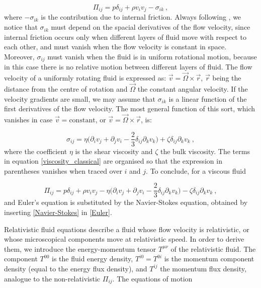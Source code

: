 \begin{equation}
\Pi_{ij} = p \delta_{ij} + \rho v_i v_j - \sigma_{ik} \: ,
\end{equation}
%
where $-\sigma_{ik}$ is the contribution due to internal friction. Always following \cite{landau2013fluid}, we notice that $\sigma_{ik}$ must depend on the spacial derivatives of the flow velocity, since internal friction occurs only when different layers of fluid move with respect to each other, and must vanish when the flow velocity is constant in space. Moreover, $\sigma_{ij}$
must vanish when the fluid is in uniform rotational motion, because in this case there is no relative motion between different layers of fluid. The flow velocity of a uniformly rotating fluid is expressed as: $\vec v = \vec \Omega \times \vec r$, $\vec r$ being the distance from the centre of rotation and $\vec \Omega$ the constant angular velocity. If the velocity gradients are small, we may assume that $\sigma_{ik}$ is a linear function of the first derivatives of the flow velocity. The most general function of this sort, which vanishes in case $\vec v = \mathrm{constant}$, or $\vec v = \vec \Omega \times \vec r$, is:

\begin{equation}
\sigma_{ij} = \eta \biggl( \partial_i v_j + \partial_j v_i -\frac{2}{3} \delta_{ij} \partial_k v_k \biggr) + \zeta \delta_{ij} \partial_{k} v_k \: ,
\label{viscosity_classical}
\end{equation}
%
where the coefficient $\eta$ is the shear viscosity and $\zeta$ the bulk viscosity. The terms in equation \ref{viscosity_classical} are organised so that the expression in parentheses vanishes when traced over $i$ and $j$. To conclude, for a viscous fluid

\begin{equation}
\Pi_{ij} = p \delta_{ij} + \rho v_i v_j - \eta \biggl( \partial_i v_j + \partial_j v_i -\frac{2}{3} \delta_{ij} \partial_k v_k \biggr) - \zeta \delta_{ij} \partial_{k} v_k \: ,
\label{Navier-Stokes}
\end{equation}
%
and Euler's equation is substituted by the Navier-Stokes equation, obtained by inserting \ref{Navier-Stokes} in \ref{Euler}.


Relativistic fluid equations describe a fluid whose flow velocity is relativistic, or whose microscopical components move at relativistic speed. In order to derive them, we introduce the energy-momentum tensor $T^{\mu\nu}$ of the relativistic fluid. The component $T^{00}$ is the fluid energy density, $T^{i0} = T^{0i}$ is the momentum component density (equal to the energy flux density), and $T^{ij}$ the momentum flux density, analogue to the non-relativistic $\Pi_{ij}$. The equations of motion

